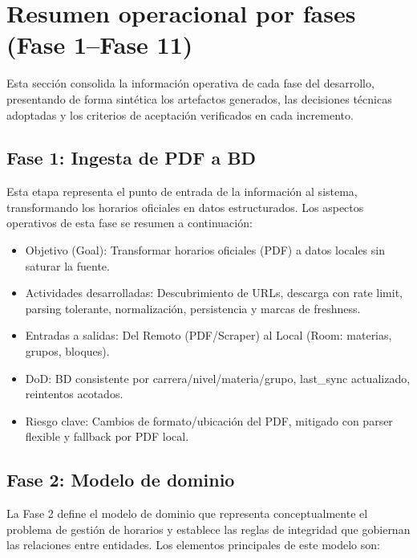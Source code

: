 \section{Resumen operacional por fases (Fase 1–Fase 11)}
Esta sección consolida la información operativa de cada fase del desarrollo, presentando de forma sintética los artefactos generados, las decisiones técnicas adoptadas y los criterios de aceptación verificados en cada incremento.




\subsection{Fase 1: Ingesta de PDF a BD}
Esta etapa representa el punto de entrada de la información al sistema, transformando los horarios oficiales en datos estructurados. Los aspectos operativos de esta fase se resumen a continuación:
\begin{itemize}
  \item Objetivo (Goal): Transformar horarios oficiales (PDF) a datos locales sin saturar la fuente.
  \item Actividades desarrolladas: Descubrimiento de URLs, descarga con rate limit, parsing tolerante, normalización, persistencia y marcas de freshness.
  \item Entradas a salidas: Del Remoto (PDF/Scraper) al Local (Room: materias, grupos, bloques).
  \item DoD: BD consistente por carrera/nivel/materia/grupo, last\_sync actualizado, reintentos acotados.
  \item Riesgo clave: Cambios de formato/ubicación del PDF, mitigado con parser flexible y fallback por PDF local.
\end{itemize}

\subsection{Fase 2: Modelo de dominio}
La Fase 2 define el modelo de dominio que representa conceptualmente el problema de gestión de horarios y establece las reglas de integridad que gobiernan las relaciones entre entidades. Los elementos principales de este modelo son:

